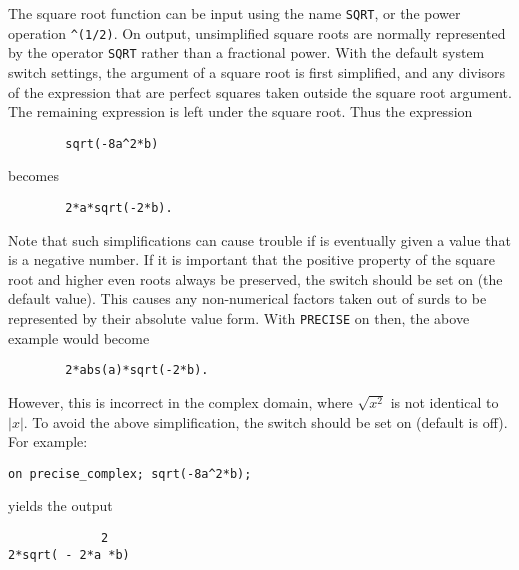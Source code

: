The square root function can be input using the name \texttt{SQRT}, or the
power operation \texttt{\textasciicircum(1/2)}.  On output, unsimplified
square roots
are normally represented by the operator \texttt{SQRT} rather than a
fractional power.  With the default system switch settings, the argument
of a square root is first simplified, and any divisors of the expression
that are perfect squares taken outside the square root argument.  The
remaining expression is left under the square root.
Thus the expression
\begin{verbatim}
        sqrt(-8a^2*b)
\end{verbatim}
becomes
\begin{verbatim}
        2*a*sqrt(-2*b).
\end{verbatim}

\hypertarget{switch:PRECISE}{}
Note that such simplifications can cause trouble if  is eventually
given a value that is a negative number.  If it is important that the
positive property of the square root and higher even roots always be
preserved, the switch  should be set on
(the default value).
This causes any non-numerical factors taken out of surds to be represented
by their absolute value form.
With %
\texttt{PRECISE} on then, the above example would become
\begin{verbatim}
        2*abs(a)*sqrt(-2*b).
\end{verbatim}

\hypertarget{switch:PRECISE_COMPLEX}{}
However, this is incorrect in the complex domain, where
$\sqrt{x^{2}}$ is not identical to $|x|$. To avoid the above
simplification, the switch
 should be set on
(default is off). For example:
\begin{verbatim}
on precise_complex; sqrt(-8a^2*b);
\end{verbatim}
yields the output
\begin{verbatim}
             2
2*sqrt( - 2*a *b)
\end{verbatim}

